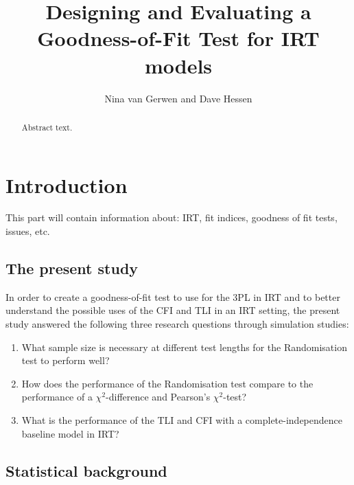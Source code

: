 \documentclass[Royal,sageapa,times,doublespace]{sagej}
\begin{document}

\title{Designing and Evaluating a Goodness-of-Fit Test for IRT models}

\author{Nina van Gerwen  and Dave Hessen}




\begin{abstract}
Abstract text.
\end{abstract}


\maketitle

\section{Introduction}
This part will contain information about: IRT, fit indices, goodness of fit tests, issues, etc.
\subsection{The present study}
In order to create a goodness-of-fit test to use for the 3PL in IRT and to better understand the possible uses of the CFI and TLI in an IRT setting, the present study answered the following three research questions through simulation studies:
\begin{enumerate}
\item{What sample size is necessary at different test lengths for the Randomisation test to perform well?}
\item{How does the performance of the Randomisation test compare to the performance of a $\chi^2$-difference and Pearson's $\chi^2$-test?}
\item{What is the performance of the TLI and CFI with a complete-independence baseline model in IRT?}
\end{enumerate}

\subsection{Statistical background}
\end{document}
